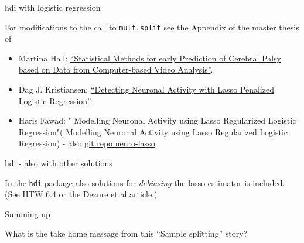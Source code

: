\documentclass[
  ignorenonframetext,
]{beamer}
\providecommand{\tightlist}{%
  \setlength{\itemsep}{0pt}\setlength{\parskip}{0pt}}
\begin{document}
\begin{frame}[fragile]

\begin{block}{hdi with logistic regression}

For modifications to the call to \texttt{mult.split} see the Appendix of
the master thesis of

\begin{itemize}
\tightlist
\item
  Martina Hall: \href{http://hdl.handle.net/11250/2453095}{``Statistical
  Methods for early Prediction of Cerebral Palsy based on Data from
  Computer-based Video Analysis''}.
\item
  Dag J. Kristiansen:
  \href{http://hdl.handle.net/11250/2624609}{``Detecting Neuronal
  Activity with Lasso Penalized Logistic Regression''}
\item
  Haris Fawad: " Modelling Neuronal Activity using Lasso Regularized
  Logistic Regression"( Modelling Neuronal Activity using Lasso
  Regularized Logistic Regression) - also
  \href{https://github.com/harisf/neuro-lasso}{git repo neuro-lasso}.
\end{itemize}

\end{block}

\begin{block}{hdi - also with other solutions}

In the \texttt{hdi} package also solutions for \emph{debiasing} the
lasso estimator is included. (See HTW 6.4 or the Dezure et al article.)

\end{block}

\end{frame}

\begin{frame}

\begin{block}{Summing up}

What is the take home message from this ``Sample splitting'' story?

\end{block}

\end{frame}
\end{document}
